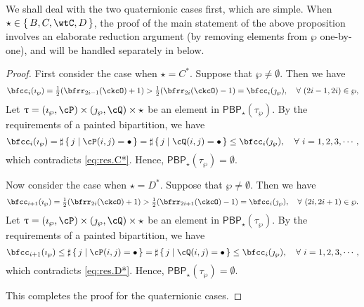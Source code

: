 \documentclass[12pt,a4paper]{amsart}
\numberwithin{equation}{section}
\theoremstyle{remark}
\def\half{{\tfrac{1}{2}}}
\def\PBP{\mathsf{PBP}}
\begin{document}

We shall deal with the two quaternionic cases first, which are simple. When $\star \in \set{B, C, \wtC, D}$, the proof of the main statement of the above proposition involves an elaborate reduction argument (by removing elements from $\wp$ one-by-one), and will be handled separately in  below.
\begin{proof}%

    \smallskip

  First consider the case when $\star = C^{*}$. Suppose that
  $\wp \neq \emptyset$. Then we have
  \begin{equation}\label{eq:res.C*}
    \bfcc_{i}(\imath_{\wp}) = \half(\bfrr_{2i-1}(\ckcO)+1)>
    \half(\bfrr_{2i}(\ckcO)-1) = \bfcc_{i}(\jmath_{\wp}),
    \quad \forall \,\, (2i-1, 2i)\in \wp,
  \end{equation}
  Let $\uptau = (\imath_{\wp}, \cP)\times (\jmath_{\wp},\cQ)\times \star$ be an element in $\PBP_{\star}(\tau_{\wp})$. By the requirements of a painted bipartition, we have
  \[
    \bfcc_{i}(\imath_{\wp}) = \sharp\set{j| \cP(i,j)=\bullet} = \sharp\set{j| \cQ(i,j)=\bullet} \leq \bfcc_{i}(\jmath_{\wp}), \quad \forall \,\, i=1,2,3,\cdots,
  \]
  which contradicts \eqref{eq:res.C*}. Hence, $\PBP_{\star}(\tau_{\wp})= \emptyset$.

  \smallskip

  Now consider the case when $\star = D^{*}$. Suppose that $\wp \neq \emptyset$.
  Then we have
  \begin{equation}\label{eq:res.D*}
    \bfcc_{i+1}(\imath_{\wp}) = \half(\bfrr_{2i}(\ckcO)+1)>
    \half(\bfrr_{2i+1}(\ckcO)-1) = \bfcc_{i}(\jmath_{\wp}),
    \quad \forall \,\, (2i, 2i+1)\in \wp.
  \end{equation}
  Let $\uptau = (\imath_{\wp}, \cP)\times (\jmath_{\wp},\cQ)\times \star$ be an element in $\PBP_{\star}(\tau_{\wp})$. By the requirements of a painted bipartition, we have
  \[
    \bfcc_{i+1}(\imath_{\wp}) \leq \sharp\set{j| \cP(i,j)=\bullet} =\sharp\set{j| \cQ(i,j)=\bullet} \leq \bfcc_{i}(\jmath_{\wp}), \quad \forall \,\, i = 1,2,3, \cdots,
  \]
  which contradicts \eqref{eq:res.D*}. Hence, $\PBP_{\star}(\tau_{\wp})= \emptyset$.

This completes the proof for the quaternionic cases.
\end{proof}
\end{document}

